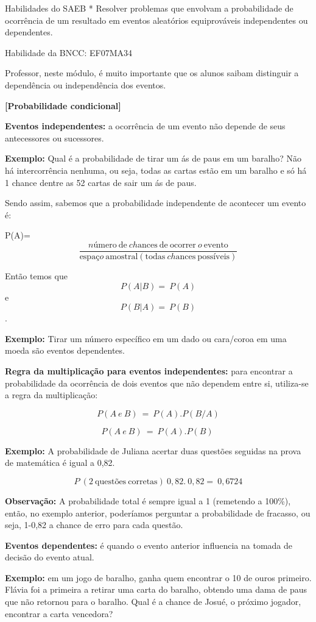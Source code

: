 Habilidades do SAEB * Resolver problemas que envolvam a probabilidade de
ocorrência de um resultado em eventos aleatórios equiprováveis
independentes ou dependentes.

Habilidade da BNCC: EF07MA34

Professor, neste módulo, é muito importante que os alunos saibam
distinguir a dependência ou independência dos eventos.

\textbf{{[}Probabilidade condicional{]}}

\textbf{Eventos independentes:} a ocorrência de um evento não depende de
seus antecessores ou sucessores.

\textbf{Exemplo:} Qual é a probabilidade de tirar um ás de paus em um
baralho? Não há intercorrência nenhuma, ou seja, todas as cartas estão
em um baralho e só há 1 chance dentre as 52 cartas de sair um ás de
paus.

Sendo assim, sabemos que a probabilidade independente de acontecer um
evento é:

P(A)=
\[\frac{nú\text{mero}\ \text{de}\ ch\text{ances}\ \text{de}\ \text{ocorrer}\ o\ \text{evento}}{\text{espa}ço\ \text{amostral}(\text{todas}\ ch\text{ances}\ \text{poss}í\text{veis})}\]

Então temos que \[P(A|B) = \ P(A)\] e \[P(B|A) = \ P(B)\].

\textbf{Exemplo:} Tirar um número específico em um dado ou cara/coroa em
uma moeda são eventos dependentes.

\textbf{Regra da multiplicação para eventos independentes:} para
encontrar a probabilidade da ocorrência de dois eventos que não dependem
entre si, utiliza-se a regra da multiplicação:

\[P(A\ e\ B)\  = \ P(A).P(B/A)\]

\[P(A\ e\ B)\  = \ P(A).P(B)\ \]

\textbf{Exemplo:} A probabilidade de Juliana acertar duas questões
seguidas na prova de matemática é igual a 0,82.

\[P\ (2\ \text{quest}õ\text{es}\ \text{corretas})\ 0,82.\ 0,82 = \ 0,6724\]

\textbf{Observação:} A probabilidade total é sempre igual a 1 (remetendo
a 100\%), então, no exemplo anterior, poderíamos perguntar a
probabilidade de fracasso, ou seja, 1-0,82 a chance de erro para cada
questão.

\textbf{Eventos dependentes:} é quando o evento anterior influencia na
tomada de decisão do evento atual.

\textbf{Exemplo:} em um jogo de baralho, ganha quem encontrar o 10 de
ouros primeiro. Flávia foi a primeira a retirar uma carta do baralho,
obtendo uma dama de paus que não retornou para o baralho. Qual é a
chance de Josué, o próximo jogador, encontrar a carta vencedora?

